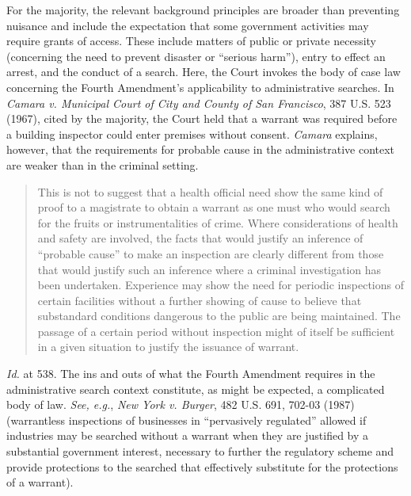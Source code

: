 For the majority, the relevant background principles are broader than
preventing nuisance and include the expectation that some government activities
may require grants of access. These include matters of public or private
necessity (concerning the need to prevent disaster or ``serious harm''), entry
to effect an arrest, and the conduct of a search. Here, the Court invokes the
body of case law concerning the Fourth Amendment's applicability to
administrative searches. In \textit{Camara v. Municipal Court of City and County
of San Francisco}, 387 U.S. 523 (1967), cited by the majority, the Court held
that a warrant was required before a building inspector could enter premises
without consent. \textit{Camara} explains, however, that the requirements for
probable cause in the administrative context are weaker than in the criminal
setting.
\begin{quote}
This is not to suggest that a health official need show the same kind of proof
to a magistrate to obtain a warrant as one must who would search for the fruits
or instrumentalities of crime. Where considerations of health and safety are
involved, the facts that would justify an inference of ``probable cause'' to
make
an inspection are clearly different from those that would justify such an
inference where a criminal investigation has been undertaken. Experience may
show the need for periodic inspections of certain facilities without a further
showing of cause to believe that substandard conditions dangerous to the public
are being maintained. The passage of a certain period without inspection might
of itself be sufficient in a given situation to justify the issuance of warrant.
\end{quote}
\textit{Id.} at 538. The ins and outs of what the Fourth Amendment
requires in the administrative search context constitute, as might be expected,
a complicated body of law. \textit{See, e.g.}, \textit{New York v. Burger}, 482
U.S. 691, 702-03 (1987) (warrantless inspections of businesses in ``pervasively
regulated'' allowed if industries may be searched without a warrant when they
are justified by a substantial government interest, necessary to further the
regulatory scheme and provide protections to the searched that effectively
substitute for the protections of a warrant). 

